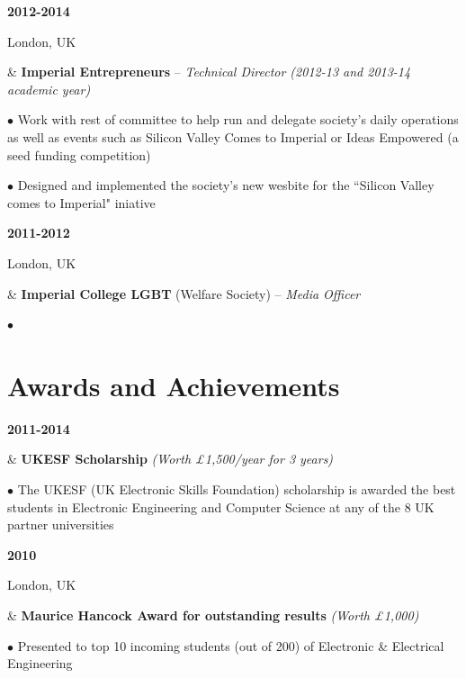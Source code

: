 \documentclass[a4paper,10pt,oneside]{article}
\begin{document}
\begin{body}
{\textbf{2012-2014} \par London, UK} & \textbf{Imperial Entrepreneurs} – \textit{Technical Director (2012-13 and 2013-14 academic year)}

$\bullet$ Work with rest of committee to help run and delegate society’s daily operations as well as events such as Silicon Valley Comes to Imperial or Ideas Empowered (a seed funding competition)

$\bullet$ Designed and implemented the society’s new wesbite for the ``Silicon Valley comes to Imperial" iniative
\\ 
{\textbf{2011-2012} \par London, UK} & \textbf{Imperial College LGBT} (Welfare Society) – \textit{Media Officer}

$\bullet$ 

\end{body}


\section*{Awards and Achievements}

\begin{body}
	{\textbf{2011-2014} \par {}} & \textbf{UKESF Scholarship} \textit{(Worth £1,500/year for 3 years)}
	
	$\bullet$ The UKESF (UK Electronic Skills Foundation) scholarship is awarded the best students in Electronic Engineering and Computer Science at any of the 8 UK partner universities
	\\
	{\textbf{2010} \par London, UK} & \textbf{Maurice Hancock Award for outstanding results} \textit{(Worth £1,000)}
	
	$\bullet$ Presented to top 10 incoming students (out of 200) of Electronic \& Electrical Engineering
	
\end{body}
\end{document}
